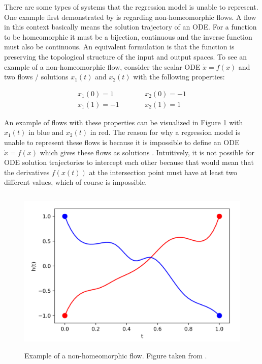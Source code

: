 \documentclass[12pt,a4paper]{book}
\begin{document}
There are some types of systems that the regression model is unable to represent. One example first demonstrated by \citep{dupont2019augmented} is regarding non-homeomorphic flows. A flow in this context basically means the solution trajectory of an ODE. For a function to be homeomorphic it must be a bijection, continuous and the inverse function must also be continuous. An equivalent formulation is that the function is preserving the topological structure of the input and output spaces. To see an example of a non-homeomorphic flow, consider the scalar ODE $\dot{x} = f(x)$ and two flows / solutions $x_1(t)$ and $x_2(t)$ with the following properties:

\begin{equation}
    \begin{aligned}
    x_1(0) = 1 & \qquad & x_2(0) = -1 \\
    x_1(1) = -1 & \qquad & x_2(1) = 1
    \end{aligned}
    \label{eq:straightlines}
\end{equation}

An example of flows with these properties can be visualized in Figure \ref{fig:nonhomeomorphicflows} with $x_1(t)$ in blue and $x_2(t)$ in red. The reason for why a regression model is unable to represent these flows is because it is impossible to define an ODE $\dot{x} = f(x)$ which gives these flows as solutions \citep{dupont2019augmented}. Intuitively, it is not possible for ODE solution trajectories to intercept each other because that would mean that the derivatives $f(x(t))$ at the intersection point must have at least two different values, which of course is impossible.

\begin{figure}[H]
    \centering
    \includegraphics[height=8cm]{figs/nonhomeomorphicflows.png}
    \caption{Example of a non-homeomorphic flow. Figure taken from \cite{dupont2019augmented}.}
    \label{fig:nonhomeomorphicflows}
\end{figure}
\end{document}
